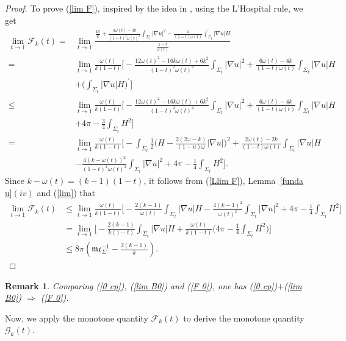 \documentclass[12pt]{article}
\theoremstyle{definition}
\theoremstyle{plain}
\newtheorem{remark}{Remark}[section]
\numberwithin{equation}{section}
\begin{document}
\begin{proof}
To prove (\ref{lim F}), inspired by the idea in \cite{Ag2}, using the L'Hospital rule, we get
\begin{equation}\label{Llim F}
\begin{aligned}
\lim\limits_{t\to 1}\mathcal{F}_{k}(t)=&\lim\limits_{t\to 1}\frac{\frac{4\pi}{k}+\frac{4\omega(t)-3k}{(1-t)^{2}\omega(t)^{2}}\int_{\Sigma_{t}}|\nabla u|^{2}-\frac{1}{(1-t)\omega(t)}\int_{\Sigma_{t}}|\nabla u|H}{\frac{1-t}{\omega(t)}}\\
=&\lim\limits_{t\to 1}\frac{\omega(t)}{k(1-t)}\Big[-\frac{12\omega(t)^{2}-16k\omega(t)+6k^{2}}{(1-t)^{2}\omega(t)^{2}}\int_{\Sigma_{t}}|\nabla u|^{2}+\frac{6\omega(t)-4k}{(1-t)\omega(t)}\int_{\Sigma_{t}}|\nabla u|H\\
&+\Big(\int_{\Sigma_{t}}|\nabla u|H\Big)^{\prime} \Big]\\
\leq&\lim\limits_{t\to 1}\frac{\omega(t)}{k(1-t)}\Big[-\frac{12\omega(t)^{2}-16k\omega(t)+6k^{2}}{(1-t)^{2}\omega(t)^{2}}\int_{\Sigma_{t}}|\nabla u|^{2}+\frac{6\omega(t)-4k}{(1-t)\omega(t)}\int_{\Sigma_{t}}|\nabla u|H\\
&+4\pi-\frac{3}{4}\int_{\Sigma_{t}}H^{2}\Big]\\
=&\lim\limits_{t\to 1}\frac{\omega(t)}{k(1-t)}\Big[-\int_{\Sigma_{t}}\frac{1}{2}\Big(H-\frac{2(2\omega-k)}{(1-u)\omega}|\nabla u|\Big)^{2}+\frac{2\omega(t)-2k}{(1-t)\omega(t)}\int_{\Sigma_{t}}|\nabla u|H\\
&-\frac{4(k-\omega(t))^{2}}{(1-t)^{2}\omega(t)^{2}}\int_{\Sigma_{t}}|\nabla u|^{2}+4\pi-\frac{1}{4}\int_{\Sigma_{t}}H^{2} \Big].
\end{aligned}
\end{equation}
Since $ k-\omega(t)=(k-1)(1-t) $, it follows from (\ref{Llim F}), Lemma~\ref{funda u}$ (iv) $ and (\ref{lim}) that
$$
\begin{aligned}
\lim\limits_{t\to 1}\mathcal{F}_{k}(t)&\leq \lim\limits_{t\to 1} \frac{\omega(t)}{k(1-t)}\Big[-\frac{2(k-1)}{\omega(t)}\int_{\Sigma_{t}}|\nabla u|H-\frac{4(k-1)^{2}}{\omega(t)^{2}}\int_{\Sigma_{t}}|\nabla u|^{2}+4\pi-\frac{1}{4}\int_{\Sigma_{t}}H^{2}  \Big]\\
&=\lim\limits_{t\to 1}\Big[-\frac{2(k-1)}{k(1-t)}\int_{\Sigma_{t}}|\nabla u|H+\frac{\omega(t)}{k(1-t)}\Big(4\pi-\frac{1}{4}\int_{\Sigma_{t}}H^{2} \Big) \Big]\\
&\leq 8\pi(\mathfrak{m}\mathfrak{c}_{\Sigma}^{-1}-\frac{2(k-1)}{k}).
\end{aligned}
$$
\end{proof}
\begin{remark}
Comparing (\ref{0 cp}), (\ref{lim B0}) and (\ref{F 0}), one has (\ref{0 cp})$+$(\ref{lim B0}) $\Rightarrow$ (\ref{F 0}).
\end{remark}
Now, we apply the monotone quantity $ \mathcal{F}_{k}(t) $ to derive the monotone quantity $\mathcal{G}_{k}(t)$.
\end{document}
